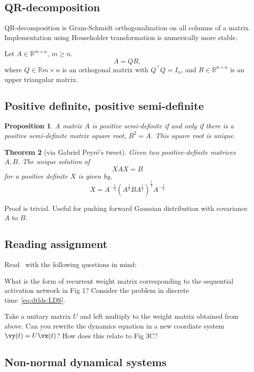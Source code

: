 \documentclass[a4paper,11pt]{exam}
\newtheorem{theorem}{Theorem}
\newtheorem{proposition}[theorem]{Proposition}
\newcounter{ct}
\newcommand{\tp}[1]{\ensuremath{{#1}^\top}} %
\newcommand{\field}[1]{\ensuremath{\mathbb{#1}}}
\newcommand{\reals}{\field{R}}
\newcommand{\onehalf}{\frac{1}{2}}
\begin{document}
\begin{questions}
\subsection{QR-decomposition}
QR-decomposition is Gram-Schmidt orthogonalization on all columns of a matrix.
Implementation using Householder transformation is numerically more stable.

Let $A \in \reals^{m \times n}$, $m \geq n$.
\[
    A = QR,
\]
where $Q \in \reals{m \times n}$ is an orthogonal matrix with $\tp{Q}Q = I_n$,
and $R \in \reals^{n \times n}$ is an upper triangular matrix.

\subsection{Positive definite, positive semi-definite}
\begin{proposition}
    A matrix $A$ is positive semi-definite if and only if there is a positive semi-definite matrix square root, $B^2 = A$. This square root is unique.
\end{proposition}

\begin{theorem}[via Gabriel Peyr\'e's tweet]
    Given two positive-definite matrices $A, B$. The unique solution of
    \[
	XAX=B
    \]
    for a positive definite $X$ is given by,
    \[
	X = A^{-\onehalf} \left( A^\onehalf B A^\onehalf \right)^\onehalf A^{-\onehalf}
    \]
\end{theorem}
Proof is trivial. Useful for pushing forward Gaussian distribution with covariance $A$ to $B$.

\subsection{Reading assignment}
Read~\citep{Goldman2009} with the following questions in mind:

\question What is the form of recurrent weight matrix corresponding to the sequential activation network in Fig 1? Consider the problem in discrete time~\eqref{eq:dtlds:LDS}.

\question Take a unitary matrix $U$ and left multiply to the weight matrix obtained from above. Can you rewrite the dynamics equation in a new coordiate system $\vy(t) = U\vx(t)$? How does this relate to Fig 3C?


\subsection{Non-normal dynamical systems}


\end{questions}
\end{document}
